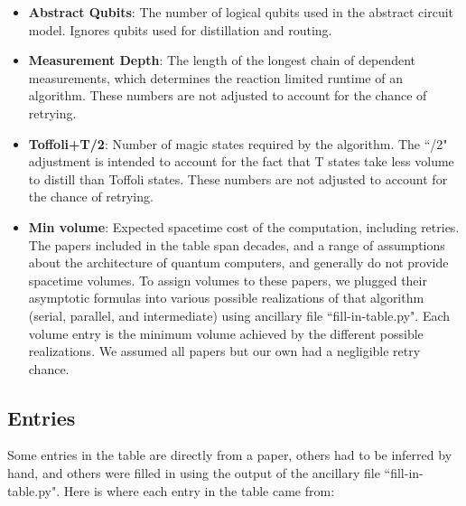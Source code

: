 \documentclass[superscriptaddress,notitlepage,longbibliography]{revtex4-1}
\theoremstyle{definition}
\theoremstyle{definition}
\begin{document}
\begin{itemize}
    \item \textbf{Abstract Qubits}:
        The number of logical qubits used in the abstract circuit model.
        Ignores qubits used for distillation and routing.
    \item \textbf{Measurement Depth}:
        The length of the longest chain of dependent measurements, which determines the reaction limited runtime of an algorithm.
        These numbers are not adjusted to account for the chance of retrying.
    \item \textbf{Toffoli+T/2}:
        Number of magic states required by the algorithm.
        The ``/2" adjustment is intended to account for the fact that T states take less volume to distill than Toffoli states.
        These numbers are not adjusted to account for the chance of retrying.
    \item \textbf{Min volume}:
        Expected spacetime cost of the computation, including retries.
        The papers included in the table span decades, and a range of assumptions about the architecture of quantum computers, and generally do not provide spacetime volumes.
        To assign volumes to these papers, we plugged their asymptotic formulas into various possible realizations of that algorithm (serial, parallel, and intermediate) using ancillary file ``fill-in-table.py".
        Each volume entry is the minimum volume achieved by the different possible realizations.
        We assumed all papers but our own had a negligible retry chance.
\end{itemize}


\subsection{Entries}

Some entries in the table are directly from a paper, others had to be inferred by hand, and others were filled in using the output of the ancillary file ``fill-in-table.py".
Here is where each entry in the table came from:
\end{document}
